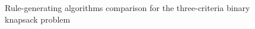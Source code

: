 \begin{figure}
  \centering
  \caption{Rule-generating algorithms comparison for the three-criteria binary knapsack problem}
  \label{c3_algo}
\end{figure}

